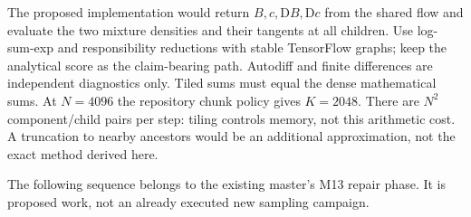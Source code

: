 \documentclass[11pt]{article}
\newcommand{\D}{\mathrm D}
\begin{document}
The proposed implementation would return $B,c,\D B,\D c$ from the shared
flow and evaluate the two mixture densities and their tangents at all
children. Use log-sum-exp and responsibility reductions with stable
TensorFlow graphs; keep the analytical score as the claim-bearing path.
Autodiff and finite differences are independent diagnostics only.
Tiled sums must equal the dense mathematical sums. At $N=4096$ the
repository chunk policy gives $K=2048$. There are $N^2$ component/child
pairs per step: tiling controls memory, not this arithmetic cost.
A truncation to nearby ancestors would be an additional approximation,
not the exact method derived here.

The following sequence belongs to the existing master's M13 repair phase.
It is proposed work, not an already executed new sampling campaign.
\end{document}
